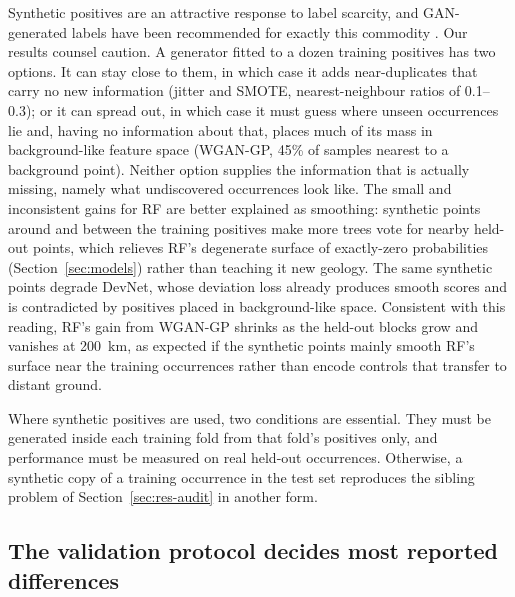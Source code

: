 \documentclass[pdflatex,sn-apa]{sn-jnl}
\begin{document}
Synthetic positives are an attractive response to label scarcity, and GAN-generated labels have been recommended for exactly this commodity \citep{Parsa2025}. Our results counsel caution. A generator fitted to a dozen training positives has two options. It can stay close to them, in which case it adds near-duplicates that carry no new information (jitter and SMOTE, nearest-neighbour ratios of 0.1--0.3); or it can spread out, in which case it must guess where unseen occurrences lie and, having no information about that, places much of its mass in background-like feature space (WGAN-GP, 45\% of samples nearest to a background point). Neither option supplies the information that is actually missing, namely what undiscovered occurrences look like. The small and inconsistent gains for RF are better explained as smoothing: synthetic points around and between the training positives make more trees vote for nearby held-out points, which relieves RF's degenerate surface of exactly-zero probabilities (Section~\ref{sec:models}) rather than teaching it new geology. The same synthetic points degrade DevNet, whose deviation loss already produces smooth scores and is contradicted by positives placed in background-like space. Consistent with this reading, RF's gain from WGAN-GP shrinks as the held-out blocks grow and vanishes at 200~km, as expected if the synthetic points mainly smooth RF's surface near the training occurrences rather than encode controls that transfer to distant ground.

Where synthetic positives are used, two conditions are essential. They must be generated inside each training fold from that fold's positives only, and performance must be measured on real held-out occurrences. Otherwise, a synthetic copy of a training occurrence in the test set reproduces the sibling problem of Section~\ref{sec:res-audit} in another form.

\subsection{The validation protocol decides most reported differences}\label{sec:disc-protocol}
\end{document}
